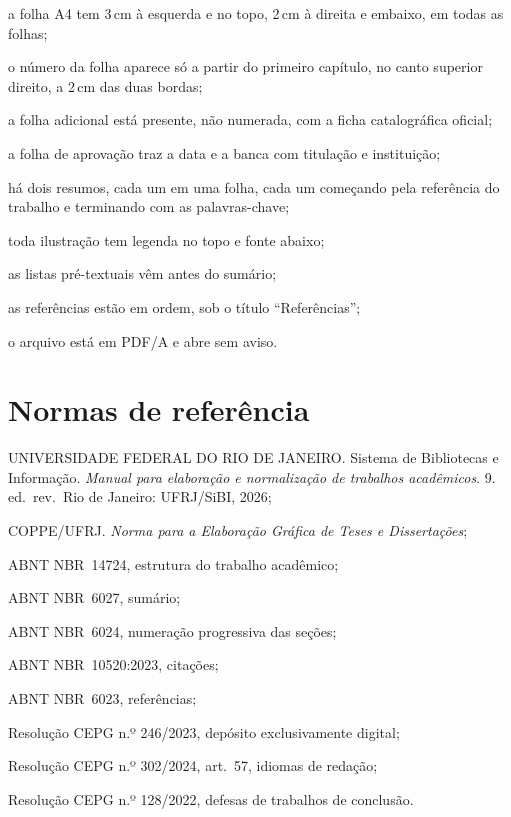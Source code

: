 \documentclass[dsc]{ufrj}
\begin{document}
  \begin{alineas}
    \item a folha A4 tem 3\,cm à esquerda e no topo, 2\,cm à direita e embaixo,
      em todas as folhas;
    \item o número da folha aparece só a partir do primeiro capítulo, no canto
      superior direito, a 2\,cm das duas bordas;
    \item a folha adicional está presente, não numerada, com a ficha
      catalográfica oficial;
    \item a folha de aprovação traz a data e a banca com titulação e
      instituição;
    \item há dois resumos, cada um em uma folha, cada um começando pela
      referência do trabalho e terminando com as palavras-chave;
    \item toda ilustração tem legenda no topo e fonte abaixo;
    \item as listas pré-textuais vêm antes do sumário;
    \item as referências estão em ordem, sob o título ``Referências'';
    \item o arquivo está em PDF/A e abre sem aviso.
  \end{alineas}

  \annex

  \chapter{Normas de referência}

  \begin{alineas}
    \item UNIVERSIDADE FEDERAL DO RIO DE JANEIRO. Sistema de Bibliotecas e
      Informação. \emph{Manual para elaboração e normalização de trabalhos
      acadêmicos}. 9.\,ed.\ rev.\ Rio de Janeiro: UFRJ/SiBI, 2026;
    \item COPPE/UFRJ. \emph{Norma para a Elaboração Gráfica de Teses e
      Dissertações};
    \item ABNT \mbox{NBR~14724}, estrutura do trabalho acadêmico;
    \item ABNT \mbox{NBR~6027}, sumário;
    \item ABNT \mbox{NBR~6024}, numeração progressiva das seções;
    \item ABNT \mbox{NBR~10520:2023}, citações;
    \item ABNT \mbox{NBR~6023}, referências;
    \item Resolução CEPG n.º 246/2023, depósito exclusivamente digital;
    \item Resolução CEPG n.º 302/2024, art.\ 57, idiomas de redação;
    \item Resolução CEPG n.º 128/2022, defesas de trabalhos de conclusão.
  \end{alineas}

  \backmatter
  \printbibliography
\end{document}

